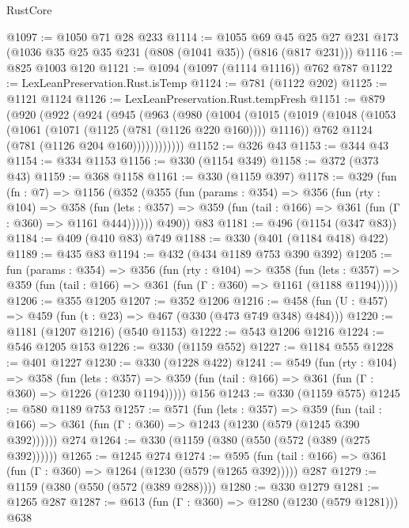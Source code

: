 \begin{lexlean}{RustCore}
\begin{coremodule}
@1097 := @1050 @71 @28 @233
@1114 := @1055
    @69
    @45
    @25
    @27
    @231
    @173
    (@1036 @35 @25 @35 @231 (@808 (@1041 @35)) (@816 (@817 @231)))
@1116 := @825 @1003 @120
@1121 := @1094 (@1097 (@1114 @1116)) @762 @787
@1122 := LexLeanPreservation.Rust.isTemp
@1124 := @781 (@1122 @202)
@1125 := @1121 @1124
@1126 := LexLeanPreservation.Rust.tempFresh
@1151 := @879
    (@920
      (@922
        (@924
          (@945
            (@963
              (@980
                (@1004
                  (@1015
                    (@1019
                      (@1048
                        (@1053 (@1061 (@1071 (@1125 (@781 (@1126 @220 @160)))) @1116))
                        @762
                        @1124
                        (@781 (@1126 @204 @160))))))))))))
@1152 := @326 @43
@1153 := @344 @43
@1154 := @334 @1153
@1156 := @330 (@1154 @349)
@1158 := @372 (@373 @43)
@1159 := @368 @1158
@1161 := @330 (@1159 @397)
@1178 := @329
    (fun (fn : @7) =>
    @1156
      (@352
        (@355
          (fun (params : @354) =>
          @356
            (fun (rty : @104) =>
            @358
              (fun (lets : @357) =>
              @359 (fun (tail : @166) => @361 (fun (Γ : @360) => @1161 @444))))))
        @490))
    @83
@1181 := @496 (@1154 (@347 @83))
@1184 := @409 (@410 @83) @749
@1188 := @330 (@401 (@1184 @418) @422)
@1189 := @435 @83
@1194 := @432 (@434 @1189 @753 @390 @392)
@1205 := fun (params : @354) =>
  @356
    (fun (rty : @104) =>
    @358
      (fun (lets : @357) =>
      @359 (fun (tail : @166) => @361 (fun (Γ : @360) => @1161 (@1188 @1194)))))
@1206 := @355 @1205
@1207 := @352 @1206
@1216 := @458 (fun (U : @457) => @459 (fun (t : @23) => @467 (@330 (@473 @749 @348) @484)))
@1220 := @1181 (@1207 @1216) (@540 @1153)
@1222 := @543 @1206 @1216
@1224 := @546 @1205 @153
@1226 := @330 (@1159 @552)
@1227 := @1184 @555
@1228 := @401 @1227
@1230 := @330 (@1228 @422)
@1241 := @549
    (fun (rty : @104) =>
    @358
      (fun (lets : @357) =>
      @359 (fun (tail : @166) => @361 (fun (Γ : @360) => @1226 (@1230 @1194)))))
    @156
@1243 := @330 (@1159 @575)
@1245 := @580 @1189 @753
@1257 := @571
    (fun (lets : @357) =>
    @359 (fun (tail : @166) => @361 (fun (Γ : @360) => @1243 (@1230 (@579 (@1245 @390 @392))))))
    @274
@1264 := @330 (@1159 (@380 (@550 (@572 (@389 (@275 @392))))))
@1265 := @1245 @274
@1274 := @595 (fun (tail : @166) => @361 (fun (Γ : @360) => @1264 (@1230 (@579 (@1265 @392))))) @287
@1279 := @1159 (@380 (@550 (@572 (@389 @288))))
@1280 := @330 @1279
@1281 := @1265 @287
@1287 := @613 (fun (Γ : @360) => @1280 (@1230 (@579 @1281))) @638

\end{coremodule}
\end{lexlean}
